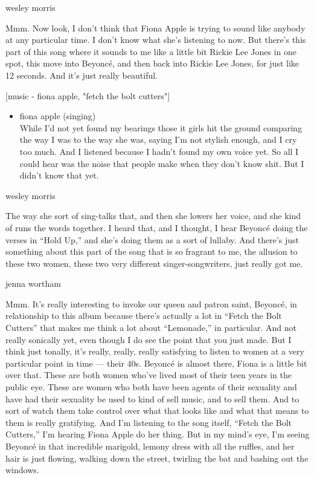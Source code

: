 wesley morris

Mmm. Now look, I don't think that Fiona Apple is trying to sound like
anybody at any particular time. I don't know what she's listening to
now. But there's this part of this song where it sounds to me like a
little bit Rickie Lee Jones in one spot, this move into Beyoncé, and
then back into Rickie Lee Jones, for just like 12 seconds. And it's just
really beautiful.

{[}music - fiona apple, "fetch the bolt cutters"{]}

\begin{itemize}
\tightlist
\item
  fiona apple (singing)\\
  While I'd not yet found my bearings those it girls hit the ground
  comparing the way I was to the way she was, saying I'm not stylish
  enough, and I cry too much. And I listened because I hadn't found my
  own voice yet. So all I could hear was the noise that people make when
  they don't know shit. But I didn't know that yet.
\end{itemize}

wesley morris

The way she sort of sing-talks that, and then she lowers her voice, and
she kind of runs the words together. I heard that, and I thought, I hear
Beyoncé doing the verses in ``Hold Up,'' and she's doing them as a sort
of lullaby. And there's just something about this part of the song that
is so fragrant to me, the allusion to these two women, these two very
different singer-songwriters, just really got me.

jenna wortham

Mmm. It's really interesting to invoke our queen and patron saint,
Beyoncé, in relationship to this album because there's actually a lot in
``Fetch the Bolt Cutters'' that makes me think a lot about ``Lemonade,''
in particular. And not really sonically yet, even though I do see the
point that you just made. But I think just tonally, it's really, really,
really satisfying to listen to women at a very particular point in time
--- their 40s. Beyoncé is almost there, Fiona is a little bit over that.
These are both women who've lived most of their teen years in the public
eye. These are women who both have been agents of their sexuality and
have had their sexuality be used to kind of sell music, and to sell
them. And to sort of watch them take control over what that looks like
and what that means to them is really gratifying. And I'm listening to
the song itself, ``Fetch the Bolt Cutters,'' I'm hearing Fiona Apple do
her thing. But in my mind's eye, I'm seeing Beyoncé in that incredible
marigold, lemony dress with all the ruffles, and her hair is just
flowing, walking down the street, twirling the bat and bashing out the
windows.

